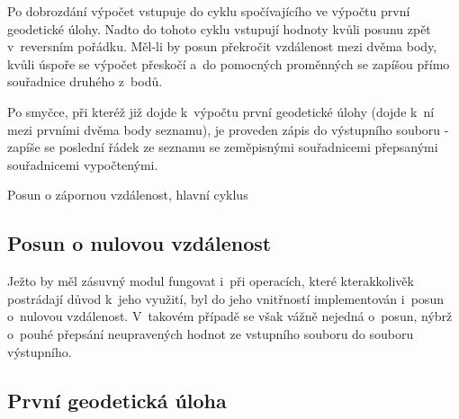 Po dobrozdání výpočet vstupuje do cyklu spočívajícího ve výpočtu první geode\-tické úlohy.
Nadto do tohoto cyklu vstupují hodnoty kvůli posunu zpět v~reversním pořádku. Měl-li by
posun překročit vzdálenost mezi dvěma body, kvůli úspoře se výpočet přeskočí a~do pomocných
proměnných se zapíšou přímo souřadnice druhého z~bodů. 

Po smyčce, při kteréž již dojde k~výpočtu první geodetické úlohy
(dojde k~ní mezi prvními dvěma body seznamu), je proveden zápis do výstupního
souboru - zapíše se poslední řádek ze seznamu se zeměpisnými souřadnicemi přepsanými
souřadnicemi vypočtenými. 

\begin{algorithm}
\caption{Posun o zápornou vzdálenost, hlavní cyklus}
    \label{fig:pseudozapornavzd-hlavnicyklus}
    \begin{algorithmic}[1]
    \ENDIF
    \ENDFOR
    \ENDWHILE
    \end{algorithmic}
\end{algorithm}

\subsection{Posun o nulovou vzdálenost}
\label{nulovavzdalenost}

Ježto by měl zásuvný modul fungovat i~při
operacích, které kterakkolivěk postrádají důvod k~jeho využití, byl do jeho
vnitřností implementován i~posun o~nulovou vzdálenost.
V~takovém případě se však vážně nejedná o~posun, nýbrž o~pouhé přepsání
neupravených hodnot ze vstupního souboru do souboru výstupního. 

\subsection{První geodetická úloha}
\label{prvniguplugin}

